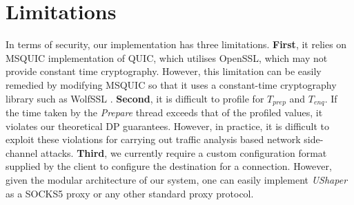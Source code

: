 \section{Limitations}
\label{sec:netshaper-limitations}

In terms of security, our implementation has three limitations.
\textbf{First}, it relies on MSQUIC implementation of QUIC, which utilises OpenSSL, which may not provide constant time cryptography.
However, this limitation can be easily remedied by modifying MSQUIC so that it uses a constant-time cryptography library such as WolfSSL \cite{wolfssl}.
\textbf{Second}, it is difficult to profile for $T_{prep}$ and $T_{enq}$. 
If the time taken by the \textit{Prepare} thread exceeds that of the profiled values, it violates our theoretical DP guarantees. 
However, in practice, it is difficult to exploit these violations for carrying out traffic analysis based network side-channel attacks.
\textbf{Third}, we currently require a custom configuration format supplied by the client to configure the destination for a connection. 
However, given the modular architecture of our system, one can easily implement \textit{UShaper} as a SOCKS5 proxy \cite{leech1996socks} or any other standard proxy protocol.